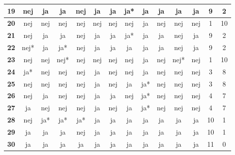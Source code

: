 \begin{table}[H]
\begin{tabular}{l|c|c|c|c|c|c|c|c|c|c|c|c|c}
\cellcolor[HTML]{C0C0C0}\textbf{19}	&nej	 & ja & ja &	nej&	ja &	ja&ja*&	ja&	ja&	ja&	ja  & \cellcolor[HTML]{EFEFEF}9 & \cellcolor[HTML]{EFEFEF}2 \\ \hline
\cellcolor[HTML]{C0C0C0}\textbf{20}	&nej	&nej&nej	&nej&	nej&	nej&	nej&\cellcolor[HTML]{FFFC9E}	ja&nej&	nej&	nej & \cellcolor[HTML]{EFEFEF}1 & \cellcolor[HTML]{EFEFEF}10 \\ \hline
\cellcolor[HTML]{C0C0C0}\textbf{21}	&nej&	ja	&ja	&nej	&ja	&ja	&ja*	&ja	&ja	&nej&	ja  & \cellcolor[HTML]{EFEFEF}9 & \cellcolor[HTML]{EFEFEF}2 \\ \hline
\cellcolor[HTML]{C0C0C0}\textbf{22}	&nej*	&ja	&ja*	&nej&	ja&	ja&	ja&	ja&	ja&	nej&	ja & \cellcolor[HTML]{EFEFEF}9 & \cellcolor[HTML]{EFEFEF}2\\ \hline
\cellcolor[HTML]{C0C0C0}\textbf{23}	&nej&	nej&nej*&	nej	&nej&	nej	&nej&	\cellcolor[HTML]{FFFC9E}ja	&nej&	nej*&	nej & \cellcolor[HTML]{EFEFEF}1 & \cellcolor[HTML]{EFEFEF}10\\ \hline
\cellcolor[HTML]{C0C0C0}\textbf{24}	&ja*	&nej&nej&nej	&ja& 	nej&	nej&	ja&	nej&	nej&	nej  & \cellcolor[HTML]{EFEFEF}3 & \cellcolor[HTML]{EFEFEF}8 \\ \hline
\cellcolor[HTML]{C0C0C0}\textbf{25}	&nej&	nej&	nej&	nej&ja&	nej&	ja&	ja*&	nej&	nej&	nej & \cellcolor[HTML]{EFEFEF}3 & \cellcolor[HTML]{EFEFEF}8 \\ \hline
\cellcolor[HTML]{C0C0C0}\textbf{26}	&nej	&ja	&nej	&nej&ja	&ja	&nej	&ja*	&nej&	nej&	nej & \cellcolor[HTML]{EFEFEF}4 & \cellcolor[HTML]{EFEFEF}7 \\ \hline
\cellcolor[HTML]{C0C0C0}\textbf{27}	&ja	&nej	&nej	&nej	&ja	&nej	&ja	&ja*	&nej	&nej	&nej & \cellcolor[HTML]{EFEFEF}4 & \cellcolor[HTML]{EFEFEF}7 \\ \hline
\cellcolor[HTML]{C0C0C0}\textbf{28}	&\cellcolor[HTML]{FFFC9E}nej	&ja*	&ja*	&ja*	&ja	&ja	&ja	&ja	&ja	&ja	&ja & \cellcolor[HTML]{EFEFEF}10 & \cellcolor[HTML]{EFEFEF}1  \\ \hline
\cellcolor[HTML]{C0C0C0}\textbf{29}	&ja	&ja	&ja	&\cellcolor[HTML]{FFFC9E}nej	&ja	&ja	&ja	&ja	&ja	&ja	&ja  & \cellcolor[HTML]{EFEFEF}10 & \cellcolor[HTML]{EFEFEF}1\\ \hline
\cellcolor[HTML]{C0C0C0}\textbf{30}	&\cellcolor[HTML]{D4EED3}ja	&\cellcolor[HTML]{D4EED3}ja	&\cellcolor[HTML]{D4EED3}ja	&\cellcolor[HTML]{D4EED3}ja	&\cellcolor[HTML]{D4EED3}ja	&\cellcolor[HTML]{D4EED3}ja	&\cellcolor[HTML]{D4EED3}ja	&\cellcolor[HTML]{D4EED3}ja	&\cellcolor[HTML]{D4EED3}ja	&\cellcolor[HTML]{D4EED3}ja	&\cellcolor[HTML]{D4EED3}ja  & \cellcolor[HTML]{EFEFEF}11 & \cellcolor[HTML]{EFEFEF}0\\ \hline

\end{tabular}
\end{table}
